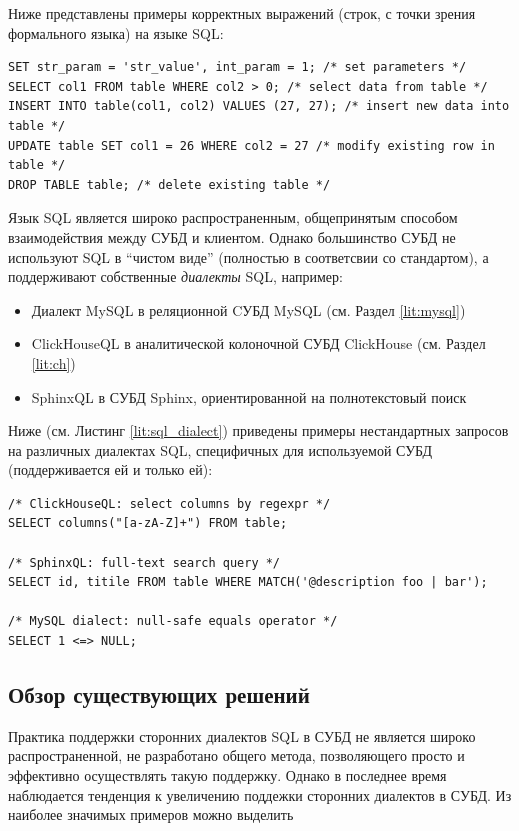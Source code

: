 Ниже представлены примеры корректных выражений (строк, с точки зрения формального языка) на языке SQL:
\begin{code}
\label{lit:sql_ex}
\begin{verbatim}
SET str_param = 'str_value', int_param = 1; /* set parameters */
SELECT col1 FROM table WHERE col2 > 0; /* select data from table */
INSERT INTO table(col1, col2) VALUES (27, 27); /* insert new data into table */
UPDATE table SET col1 = 26 WHERE col2 = 27 /* modify existing row in table */
DROP TABLE table; /* delete existing table */
\end{verbatim}
\end{code}

Язык SQL является широко распространенным, общепринятым способом взаимодействия между СУБД и клиентом. Однако большинство СУБД не используют SQL в \enquote{чистом виде} (полностью в соответсвии со стандартом), а поддерживают собственные \textit{диалекты} SQL, например:
\begin{itemize}
    \item Диалект MySQL в реляционной CУБД MySQL (см. Раздел \ref{lit:mysql})
    \item ClickHouseQL в аналитической колоночной СУБД ClickHouse (см. Раздел \ref{lit:ch})
    \item SphinxQL в СУБД Sphinx, ориентированной на полнотекстовый поиск
\end{itemize}

Ниже (см. Листинг \ref{lit:sql_dialect}) приведены примеры нестандартных запросов на различных диалектах SQL, специфичных для используемой СУБД (поддерживается ей и только ей):

\begin{code}
\label{lit:sql_dialect}
\begin{verbatim}
/* ClickHouseQL: select columns by regexpr */ 
SELECT columns("[a-zA-Z]+") FROM table;

/* SphinxQL: full-text search query */
SELECT id, titile FROM table WHERE MATCH('@description foo | bar');

/* MySQL dialect: null-safe equals operator */
SELECT 1 <=> NULL;
\end{verbatim}
\end{code}

\subsection{Обзор существующих решений}
Практика поддержки сторонних диалектов SQL в СУБД не является широко распространенной, не разработано общего метода, позволяющего просто и эффективно осуществлять такую поддержку. Однако в последнее время наблюдается тенденция к увеличению поддежки сторонних диалектов в СУБД. Из наиболее значимых примеров можно выделить

